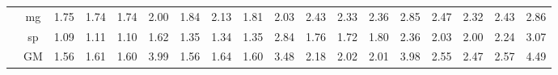 \begin{table*}[]
\begin{center}
{\begin{tabular}{|c|c|rrrr|rrrr|rrrr|rrrr|}
 &  mg  &  1.75  & \cellcolor{blue!25} 1.74  &  1.74  &   2.00  &  1.84  &  2.13  & \cellcolor{blue!25} 1.81  &   2.03  &  2.43  & \cellcolor{blue!25} 2.33  &  2.36  &  2.85  &  2.47  & \cellcolor{blue!25} 2.32  &  2.43  &   2.86 \\
 &  sp  &  1.09  &  1.11  & \cellcolor{blue!25} 1.10  &   1.62  &  1.35  & \cellcolor{blue!25} 1.34  &  1.35  &   2.84  &  1.76  & \cellcolor{blue!25} 1.72  &  1.80  &  2.36  &  2.03  & \cellcolor{blue!25} 2.00  &  2.24  &   3.07 \\
 &  GM  &  1.56  &  1.61  & \cellcolor{blue!25} 1.60  &   3.99  &  1.56  &  1.64  & \cellcolor{blue!25} 1.60  &   3.48  &  2.18  & \cellcolor{blue!25} 2.02  & \cellcolor{blue!25} 2.01  &  3.98  &  2.55  & \cellcolor{blue!25} 2.47  &  2.57  &   4.49 \\
\hline 
\end{tabular} }

\end{center}
\end{table*}
